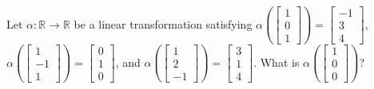 \documentclass{article}
\begin{document}
\setcounter{section}{6}
\setcounter{problem}{233}
\begin{problem}
Let $\alpha:\mathbb{R}\to\mathbb{R}$ be a linear transformation satisfying $\alpha\left(\begin{bmatrix}
1\\0\\1
\end{bmatrix}\right)=\begin{bmatrix}
-1\\3\\4
\end{bmatrix}$, $\alpha\left(\begin{bmatrix}
1\\-1\\1
\end{bmatrix}\right)=\begin{bmatrix}
0\\1\\0
\end{bmatrix}$, and $\alpha\left(\begin{bmatrix}
1\\2\\-1
\end{bmatrix}\right)=\begin{bmatrix}
3\\1\\4
\end{bmatrix}$. What is $\alpha\left( \begin{bmatrix} 1\\0\\0 \end{bmatrix} \right)$?
\end{problem}
\end{document}
